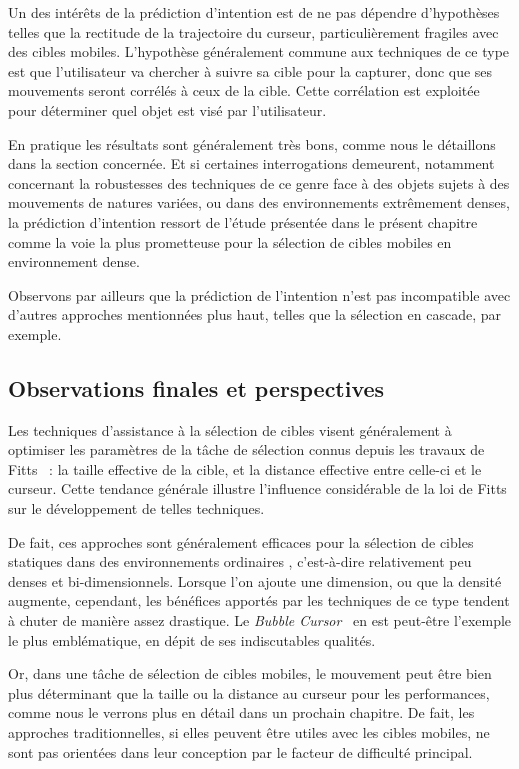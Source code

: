     Un des intérêts de la prédiction d'intention est de ne pas dépendre d'hypothèses telles que la rectitude de la trajectoire du curseur, particulièrement \og fragiles \fg{} avec des cibles mobiles. L'hypothèse généralement commune aux techniques de ce type est que l'utilisateur va chercher à \og suivre \fg{} sa cible pour la capturer, donc que ses mouvements seront corrélés à ceux de la cible. Cette corrélation est exploitée pour déterminer quel objet est visé par l'utilisateur.
    
    En pratique les résultats sont généralement très bons, comme nous le détaillons dans la section concernée. Et si certaines interrogations demeurent, notamment concernant la robustesses des techniques de ce genre face à des objets sujets à des mouvements de natures variées, ou dans des environnements extrêmement denses, la prédiction d'intention ressort de l'étude présentée dans le présent chapitre comme la voie la plus prometteuse pour la sélection de cibles mobiles en environnement dense.
    
    Observons par ailleurs que la prédiction de l'intention n'est pas incompatible avec d'autres approches mentionnées plus haut, telles que la sélection en cascade, par exemple.
    
    \subsection{Observations finales et perspectives}
    Les techniques d'assistance à la sélection de cibles visent généralement à optimiser les paramètres de la tâche de sélection connus depuis les travaux de Fitts~\cite{fitts1954information} : la taille effective de la cible, et la distance effective entre celle-ci et le curseur. Cette tendance générale illustre l'influence considérable de la loi de Fitts sur le développement de telles techniques.
    
    De fait, ces approches sont généralement efficaces pour la sélection de cibles statiques dans des environnements \og ordinaires \fg{}, c'est-à-dire relativement peu denses et bi-dimensionnels. Lorsque l'on ajoute une dimension, ou que la densité augmente, cependant, les bénéfices apportés par les techniques de ce type tendent à chuter de manière assez drastique. Le \emph{Bubble Cursor}~\cite{grossman2005bubble} en est peut-être l'exemple le plus emblématique, en dépit de ses indiscutables qualités.
    
    Or, dans une tâche de sélection de cibles mobiles, le mouvement peut être bien plus déterminant que la taille ou la distance au curseur pour les performances, comme nous le verrons plus en détail dans un prochain chapitre. De fait, les approches traditionnelles, si elles peuvent être utiles avec les cibles mobiles, ne sont pas orientées dans leur conception par le facteur de difficulté principal.
    
